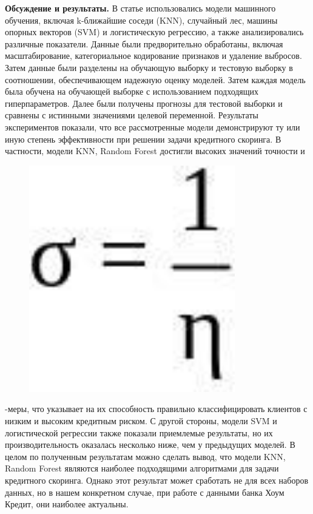 {\bfseries Обсуждение и результаты.} В статье использовались модели
машинного обучения, включая k-ближайшие соседи (KNN), случайный лес,
машины опорных векторов (SVM) и логистическую регрессию, а также
анализировались различные показатели. Данные были предворительно
обработаны, включая масштабирование, категориальное кодирование
признаков и удаление выбросов. Затем данные были разделены на обучающую
выборку и тестовую выборку в соотношении, обеспечивающем надежную оценку
моделей. Затем каждая модель была обучена на обучающей выборке с
использованием подходящих гиперпараметров. Далее были получены прогнозы
для тестовой выборки и сравнены с истинными значениями целевой
переменной. Результаты экспериментов показали, что все рассмотренные
модели демонстрируют ту или иную степень эффективности при решении
задачи кредитного скоринга. В частности, модели KNN, Random Forest
достигли высоких значений точности и
\begin{figure}[H]
	\centering
	\includegraphics[width=0.8\textwidth]{assets/34}
	\caption*{}
\end{figure}-меры, что указывает на их
способность правильно классифицировать клиентов с низким и высоким
кредитным риском. С другой стороны, модели SVM и логистической регрессии
также показали приемлемые результаты, но их производительность оказалась
несколько ниже, чем у предыдущих моделей. В целом по полученным
результатам можно сделать вывод, что модели KNN, Random Forest являются
наиболее подходящими алгоритмами для задачи кредитного скоринга. Однако
этот результат может сработать не для всех наборов данных, но в нашем
конкретном случае, при работе с данными банка Хоум Кредит, они наиболее
актуальны.

